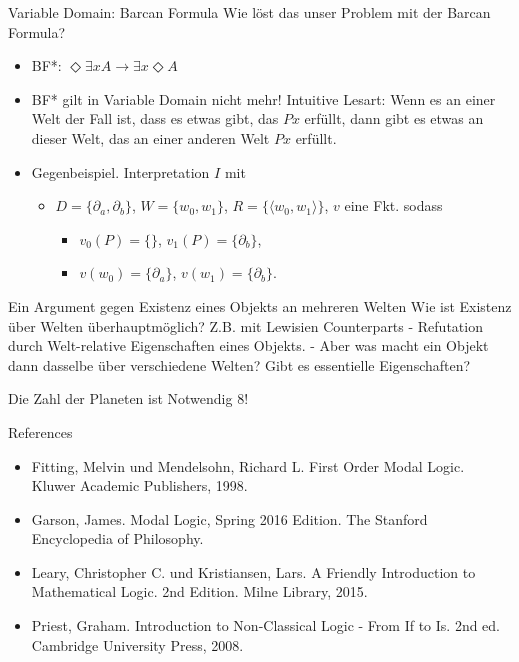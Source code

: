 \documentclass[12pt]{beamer}
\begin{document}
\begin{frame}{Variable Domain: Barcan Formula}
  Wie löst das unser Problem mit der Barcan Formula?
  \begin{itemize}[<+->]
  \item \begin{center} BF*:
      $\Diamond \exists x A \to \exists x \Diamond A$
    \end{center}
  \item BF* gilt in Variable Domain nicht mehr! Intuitive Lesart: Wenn
    es an einer Welt der Fall ist, dass es etwas gibt, das $Px$
    erfüllt, dann gibt es etwas an dieser Welt, das an einer anderen
    Welt $Px$ erfüllt.
  \item Gegenbeispiel. Interpretation $I$ mit
    \begin{itemize}[<+->]
    \item $D = \{\partial_a, \partial_b\}$, $W = \{w_0, w_1\}$, $R = \{\langle w_0, w_1 \rangle\}$, $v$ eine Fkt. sodass
      \begin{itemize}[<+->]
      \item $v_0(P) = \{\}$, $v_1(P) = \{\partial_b\}$,
      \item $v(w_0) = \{\partial_a\}$, $v(w_1) = \{\partial_b\}$.
      \end{itemize}
    \end{itemize}

\end{itemize}
  \end{frame}

\begin{frame}{Ein Argument gegen Existenz eines Objekts an mehreren Welten}
  Wie ist Existenz über Welten überhauptmöglich?  Z.B. mit Lewisien
  Counterparts - Refutation durch Welt-relative Eigenschaften eines
  Objekts.  - Aber was macht ein Objekt dann dasselbe über
  verschiedene Welten? Gibt es essentielle Eigenschaften?
\end{frame}

\begin{frame}{Die Zahl der Planeten ist Notwendig 8!}
  
\end{frame}

\begin{frame}{References}
  
  \begin{itemize}
  \item Fitting, Melvin und Mendelsohn, Richard L. First Order Modal
    Logic. Kluwer Academic Publishers, 1998.
  \item Garson, James. Modal Logic, Spring 2016 Edition. The Stanford
    Encyclopedia of Philosophy.
  \item Leary, Christopher C. und Kristiansen, Lars. A Friendly
    Introduction to Mathematical Logic. 2nd Edition. Milne Library,
    2015.
  \item Priest, Graham. Introduction to Non-Classical Logic - From If
    to Is. 2nd ed. Cambridge University Press, 2008.

  \end{itemize}

\end{frame}
\end{document}
